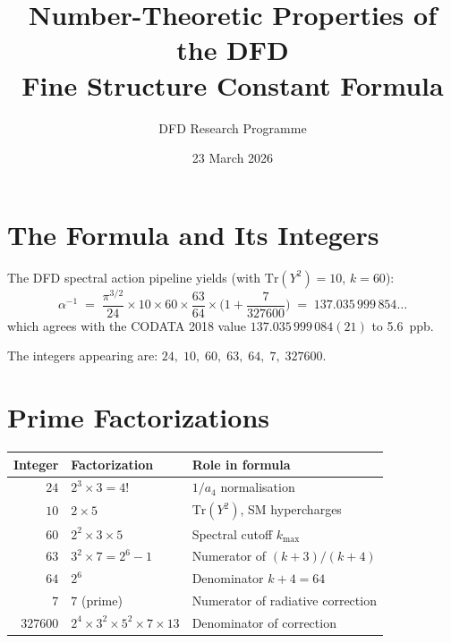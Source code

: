 \documentclass[11pt]{article}
\title{Number-Theoretic Properties of the DFD\\
Fine Structure Constant Formula}
\author{DFD Research Programme}
\date{23 March 2026}
\begin{document}
\maketitle

\section{The Formula and Its Integers}
\label{sec:formula}

The DFD spectral action pipeline yields (with $\mathrm{Tr}(Y^2)=10$, $k=60$):
\begin{equation}
\alpha^{-1}
\;=\;
\frac{\pi^{3/2}}{24}\times 10 \times 60
\times \frac{63}{64}
\times \biggl(1 + \frac{7}{327600}\biggr)
\;=\; 137.035\,999\,854\ldots
\label{eq:master}
\end{equation}
which agrees with the CODATA 2018 value $137.035\,999\,084(21)$ to 5.6~ppb.

The integers appearing are: $24,\;10,\;60,\;63,\;64,\;7,\;327600$.

\section{Prime Factorizations}
\label{sec:primes}

\begin{center}
\renewcommand{\arraystretch}{1.3}
\begin{tabular}{r@{\;=\;}l@{\qquad}l}
\toprule
\textbf{Integer} & \textbf{Factorization} & \textbf{Role in formula} \\
\midrule
$24$     & $2^3\times 3 = 4!$              & $1/a_4$ normalisation \\
$10$     & $2\times 5$                      & $\mathrm{Tr}(Y^2)$, SM hypercharges \\
$60$     & $2^2\times 3\times 5$            & Spectral cutoff $k_{\max}$ \\
$63$     & $3^2\times 7 = 2^6-1$            & Numerator of $(k+3)/(k+4)$ \\
$64$     & $2^6$                            & Denominator $k+4 = 64$ \\
$7$      & $7$ (prime)                      & Numerator of radiative correction \\
$327600$ & $2^4\times 3^2\times 5^2\times 7\times 13$ & Denominator of correction \\
\bottomrule
\end{tabular}
\end{center}
\end{document}
